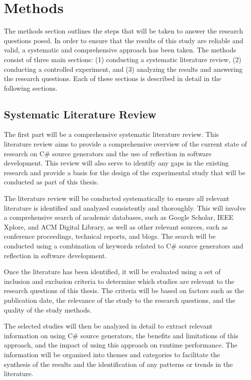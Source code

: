 \chapter{Methods}

The methods section outlines the steps that will be taken to answer the research questions posed. In order to ensure that the results of this study are reliable and valid, a systematic and comprehensive approach has been taken. The methods consist of three main sections: (1) conducting a systematic literature review, (2) conducting a controlled experiment, and (3) analyzing the results and answering the research questions. Each of these sections is described in detail in the following sections.


\section{Systematic Literature Review}

The first part will be a comprehensive systematic literature review. This literature review aims to provide a comprehensive overview of the current state of research on C\# source generators and the use of reflection in software development. This review will also serve to identify any gaps in the existing research and provide a basis for the design of the experimental study that will be conducted as part of this thesis.

The literature review will be conducted systematically to ensure all relevant literature is identified and analyzed consistently and thoroughly. This will involve a comprehensive search of academic databases, such as Google Scholar, IEEE Xplore, and ACM Digital Library, as well as other relevant sources, such as conference proceedings, technical reports, and blogs. The search will be conducted using a combination of keywords related to C\# source generators and reflection in software development.

Once the literature has been identified, it will be evaluated using a set of inclusion and exclusion criteria to determine which studies are relevant to the research questions of this thesis. The criteria will be based on factors such as the publication date, the relevance of the study to the research questions, and the quality of the study methods.

The selected studies will then be analyzed in detail to extract relevant information on using C\# source generators, the benefits and limitations of this approach, and the impact of using this approach on runtime performance. The information will be organized into themes and categories to facilitate the synthesis of the results and the identification of any patterns or trends in the literature.

